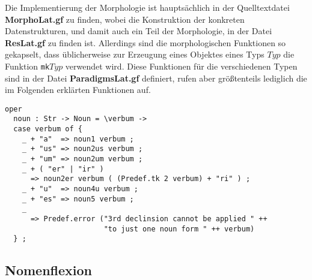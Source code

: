 Die Implementierung der Morphologie ist hauptsächlich in der Quelltextdatei \textbf{MorphoLat.gf} zu finden, wobei die Konstruktion der konkreten Datenstrukturen, und damit auch ein Teil der Morphologie, in der Datei \textbf{ResLat.gf} zu finden ist. Allerdings sind die morphologischen Funktionen so gekapselt, dass üblicherweise zur Erzeugung eines Objektes eines Typs $Typ$ die Funktion \texttt{mk$Typ$} verwendet wird. Diese Funktionen für die verschiedenen Typen sind in der Datei \textbf{ParadigmsLat.gf} definiert, rufen aber größtenteils lediglich die im Folgenden erklärten Funktionen auf.
\begin{lstlisting}[float=h!tp,caption={Beispiel für ein Smart Paradigm mit Hilfe von Pattern Matching und Fallunterscheidung (vgl. \textbf{MorphoLat.gf})},label={GF-Morpho-Noun}]
oper
  noun : Str -> Noun = \verbum -> 
  case verbum of {
    _ + "a"  => noun1 verbum ;
    _ + "us" => noun2us verbum ;
    _ + "um" => noun2um verbum ;
    _ + ( "er" | "ir" ) 
      => noun2er verbum ( (Predef.tk 2 verbum) + "ri" ) ;
    _ + "u"  => noun4u verbum ;
    _ + "es" => noun5 verbum ;
    _  
      => Predef.error ("3rd declinsion cannot be applied " ++ 
                       "to just one noun form " ++ verbum)
  } ;
\end{lstlisting}
\subsection{Nomenflexion}
\label{subsec:nomen}
